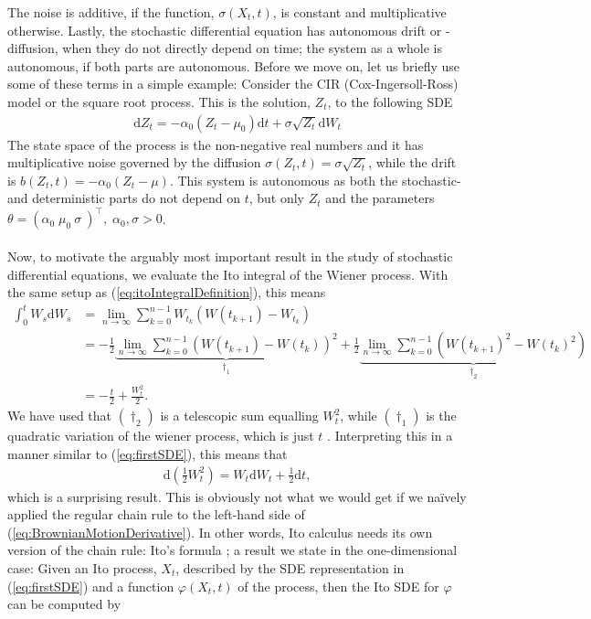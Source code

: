 The noise is additive, if the function, $\sigma(X_t, t)$, is constant and multiplicative otherwise. Lastly, the stochastic differential equation has autonomous drift or -diffusion, when they do not directly depend on time; the system as a whole is autonomous, if both parts are autonomous. Before we move on, let us briefly use some of these terms in a simple example: Consider the CIR (Cox-Ingersoll-Ross) model or the square root process. This is the solution, $Z_t$, to the following SDE
\begin{align}
    \mathrm{d}Z_t = -\alpha_0\left(Z_t - \mu_0\right)\mathrm{d}t + \sigma\sqrt{Z_t}\mathrm{d}W_t \label{eq:CIR_process}
\end{align}
The state space of the process is the non-negative real numbers and it has multiplicative noise governed by the diffusion $\sigma\left(Z_t, t\right) = \sigma\sqrt{Z_t}$, while the drift is $b(Z_t, t) = -\alpha_0\left(Z_t - \mu\right)$. This system is autonomous as both the stochastic- and deterministic parts do not depend on $t$, but only $Z_t$ and the parameters  $\theta = \left(\alpha_0\; \mu_0\: \sigma\:\right)^\top,\; \alpha_0, \sigma>0$.\\\\
Now, to motivate the arguably most important result in the study of stochastic differential equations, we evaluate the Ito integral of the Wiener process. With the same setup as (\ref{eq:itoIntegralDefinition}), this means
\begin{align}
    \int_0^t W_s \mathrm{d}W_s & = \lim_{n \to \infty}\sum_{k = 0}^{n-1} W_{t_k}\left(W(t_{k + 1}) - W_{t_k}\right) \nonumber \\ 
    & = - \frac{1}{2}\underbrace{\lim_{n \to \infty}\sum_{k = 0}^{n-1} \left(W(t_{k + 1}) - W(t_{k})\right)^2}_{\dagger_1}  + \frac{1}{2}\underbrace{\lim_{n \to \infty}\sum_{k = 0}^{n-1}\left(W(t_{k + 1})^2 - W(t_{k})^2\right)}_{\dagger_2} \nonumber \\
    & = -\frac{t}{2} + \frac{W_t^2}{2}.
\end{align}
We have used that $(\dagger_2)$ is a telescopic sum equalling $W_t^2$, while $(\dagger_1)$ is the quadratic variation of the wiener process, which is just $t$ \cite[theorem 11.34]{Hansen2022}. Interpreting this in a manner similar to (\ref{eq:firstSDE}), this means that
\begin{align}
    \mathrm{d}\left(\frac{1}{2}W_t^2\right) = W_t\mathrm{d}W_t + \frac{1}{2}\mathrm{d}t, \label{eq:BrownianMotionDerivative}
\end{align}
which is a surprising result. This is obviously not what we would get if we naïvely applied the regular chain rule to the left-hand side of (\ref{eq:BrownianMotionDerivative}). In other words, Ito calculus needs its own version of the chain rule: Ito's formula \cite[Theorem 4.2]{Srkk2019}; a result we state in the one-dimensional case:  Given an Ito process, $X_t$, described by the SDE representation in (\ref{eq:firstSDE}) and a function $\varphi(X_t, t)$ of the process, then the Ito SDE for $\varphi$ can be computed by
